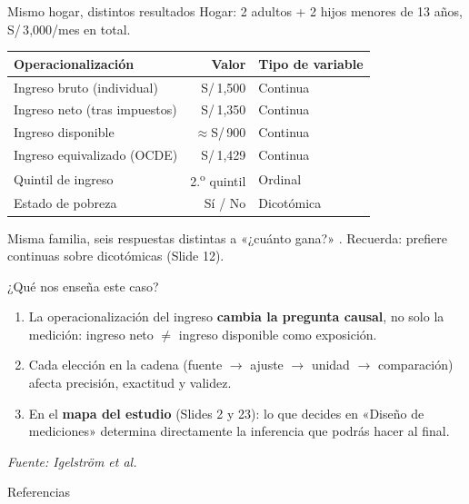 \documentclass[aspectratio=169, 12pt, xcolor=table]{beamer}
\begin{document}
\begin{frame}{Mismo hogar, distintos resultados}
  {\small Hogar: 2 adultos + 2 hijos menores de 13 años, S/\,3{,}000/mes en total.}

  \vspace{6pt}
  \begin{center}
  {\footnotesize
  \begin{tabular}{p{4.6cm} r p{3.0cm}}
    \toprule
    \textbf{Operacionalización} & \textbf{Valor} & \textbf{Tipo de variable} \\
    \midrule
    Ingreso bruto (individual)     & S/\,1{,}500 & Continua \\
    Ingreso neto (tras impuestos)  & S/\,1{,}350 & Continua \\
    Ingreso disponible             & $\approx$S/\,900 & Continua \\
    Ingreso equivalizado (OCDE)    & S/\,1{,}429 & Continua \\
    Quintil de ingreso             & 2.\textsuperscript{o} quintil & Ordinal \\
    Estado de pobreza              & Sí / No & Dicotómica \\
    \bottomrule
  \end{tabular}
  }
  \end{center}

  \vspace{6pt}
  \begin{nota}
    Misma familia, seis respuestas distintas a «¿cuánto gana?»
    \cite{Igelstrom2024-bq}.
    Recuerda: prefiere continuas sobre dicotómicas (Slide 12).
  \end{nota}
\end{frame}

\begin{frame}{¿Qué nos enseña este caso?}
  \begin{clave}
    \begin{enumerate}
      \item La operacionalización del ingreso \textbf{cambia la pregunta causal},
            no solo la medición: ingreso neto $\neq$ ingreso disponible como
            exposición.
      \item Cada elección en la cadena
            (fuente $\to$ ajuste $\to$ unidad $\to$ comparación)
            afecta precisión, exactitud y validez.
      \item En el \textbf{mapa del estudio} (Slides 2 y 23): lo que decides
            en «Diseño de mediciones» determina directamente la
            inferencia que podrás hacer al final.
    \end{enumerate}
  \end{clave}
  \vspace{4pt}
  {\footnotesize\color{textdark!70}\itshape
  Fuente: Igelström et al.\ \cite{Igelstrom2024-bq}}
\end{frame}

\begin{frame}[allowframebreaks]{Referencias}
  \nocite{Browner2022-yv, Streiner2024-my, Bland1986-di, Igelstrom2024-bq}
  \printbibliography[heading=none]
\end{frame}
\end{document}
